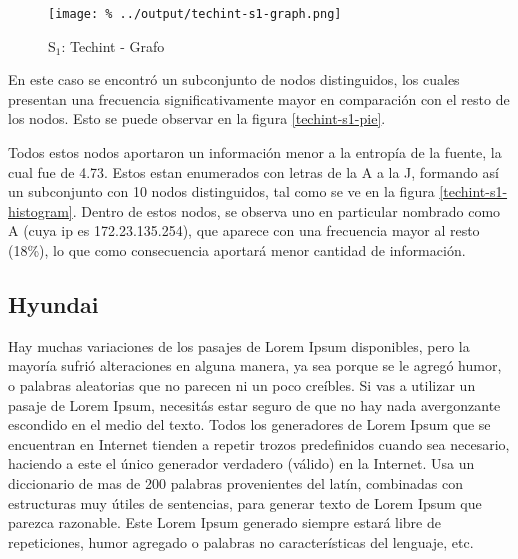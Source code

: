 \documentclass[final,inline,a4paper,narroweqnarray]{ieee}
\begin{document}
    \begin{figure}[H]\begin{center}
      \texttt{[image: \%
      ../output/techint-s1-graph.png]}
      \vspace{-2em}
      \caption{S$_1$: Techint - Grafo}
      \label{techint-s1-graph}
    \end{center}\end{figure}
  

  En este caso se encontró un subconjunto de nodos distinguidos, los cuales
  presentan una frecuencia significativamente mayor en comparación con el
  resto de los nodos. Esto se puede observar en la figura
  \ref{techint-s1-pie}. 

  Todos estos nodos aportaron un información menor a la entropía de la
  fuente, la cual fue de 4.73. Estos estan enumerados con letras de la A a
  la J, formando así un subconjunto con 10 nodos distinguidos, tal como se
  ve en la figura \ref{techint-s1-histogram}. Dentro de estos nodos, se
  observa uno en particular nombrado como A (cuya ip es 172.23.135.254), que
  aparece con una frecuencia mayor al resto (18\%), lo que como consecuencia
  aportará menor cantidad de información.

  \subsection{Hyundai}

Hay muchas variaciones de los pasajes de Lorem Ipsum disponibles, pero la mayoría sufrió alteraciones en alguna manera, ya sea porque se le agregó humor, o palabras aleatorias que no parecen ni un poco creíbles. Si vas a utilizar un pasaje de Lorem Ipsum, necesitás estar seguro de que no hay nada avergonzante escondido en el medio del texto. Todos los generadores de Lorem Ipsum que se encuentran en Internet tienden a repetir trozos predefinidos cuando sea necesario, haciendo a este el único generador verdadero (válido) en la Internet. Usa un diccionario de mas de 200 palabras provenientes del latín, combinadas con estructuras muy útiles de sentencias, para generar texto de Lorem Ipsum que parezca razonable. Este Lorem Ipsum generado siempre estará libre de repeticiones, humor agregado o palabras no características del lenguaje, etc.
\end{document}
